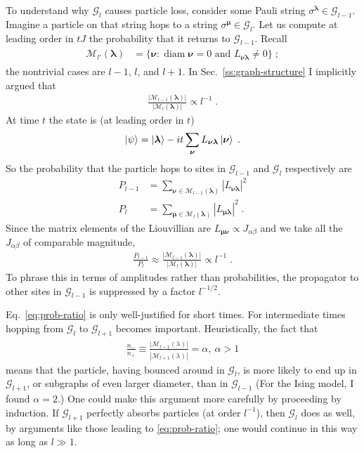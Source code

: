 \documentclass[aps,prb,nofootinbib,twocolumn,balancelastpage,amsmath,amssymb,floatfix,superscriptaddress,]{revtex4-1}
\DeclareMathOperator{\diam}{diam}
\newcommand{\pool}{\mathcal G}
\begin{document}
To understand why $\pool_l$ causes particle loss,
consider some Pauli string $\sigma^{\bm \lambda} \in \pool_{l-1}$.
Imagine a particle on that string hops to a string $\sigma^{\bm \mu} \in \pool_{l}$.
Let us compute at leading order in $tJ$ the probability that it returns to $\pool_{l-1}$.
Recall
\begin{align}
  \begin{split}
    \mathcal M_{l'}(\bm \lambda)
    &= \{
    \bm \nu : \text{$\diam \bm \nu = 0$ and $L_{\bm \nu\bm \lambda} \ne 0$}
    \}\;;
  \end{split}
\end{align}
the nontrivial cases are $l-1$, $l$, and $l+1$.
In Sec.~\ref{ss:graph-structure} I implicitly argued that
\begin{align}
 \frac{ |\mathcal M_{l-1}(\bm \lambda)|}{|\mathcal M_{l}(\bm \lambda)|} \propto l^{-1}\;.
\end{align}
At time $t$ the state is (at leading order in $t$)
\begin{align}
  \ket \psi = \ket{\bm\lambda} - it \sum_{\bm \nu} L_{\bm\nu\bm\lambda}\ket{\bm \nu}\;.
\end{align}
So the probability that the particle hops to sites in $\pool_{l-1}$ and $\pool_{l}$ respectively are
\begin{align}
  P_{l-1} &= \sum_{\bm \nu \in \mathcal M_{l-1}(\bm \lambda)} |L_{\bm \nu\bm\lambda} |^2 \\
  P_{l} &= \sum_{\bm \mu \in \mathcal M_{l}(\bm \lambda)} |L_{\bm \mu\bm\lambda} |^2\;.
\end{align}
Since the matrix elements of the Liouvillian are $L_{\bm\mu\bm\nu} \propto J_{\alpha\beta}$ and we take all the $J_{\alpha\beta}$ of comparable magnitude,
\begin{align}
  \label{eq:prob-ratio}
  \frac {P_{l-1}}{P_l} \approx \frac{ |\mathcal M_{l-1}(\bm \lambda)|}{|\mathcal M_{l}(\bm \lambda)|} \propto l^{-1}\;.
\end{align}
To phrase this in terms of amplitudes rather than probabilities,
the propagator to other sites in $\pool_{l-1}$ is suppressed by a factor $l^{-1/2}$.

Eq.~\ref{eq:prob-ratio} is only well-justified for short times.
For intermediate times hopping from $\pool_{l}$ to $\pool_{l+1}$ becomes important.
Heuristically, the fact that
\begin{align}
  \frac{n_-}{n_+}
  \equiv
  \frac {\overline{|\mathcal M_{l-1}(\lambda) |}}
  {\overline{|\mathcal M_{l+1}(\lambda) |}}
  = \alpha,\ \alpha > 1
\end{align}
means that the particle, having bounced around in $\mathcal G_l$,
is more likely to end up in $\mathcal G_{l+1}$,
or subgraphs of even larger diameter,
than in $\mathcal G_{l-1}$
(For the Ising model, I found $\alpha = 2$.)
One could make this argument more carefully by proceeding by induction.
If $\mathcal G_{l+1}$ perfectly absorbs particles (at order $l^{-1}$),
then $\mathcal G_l$ does as well, by arguments like those leading to \eqref{eq:prob-ratio};
one would continue in this way as long as $l \gg 1$.
\end{document}
